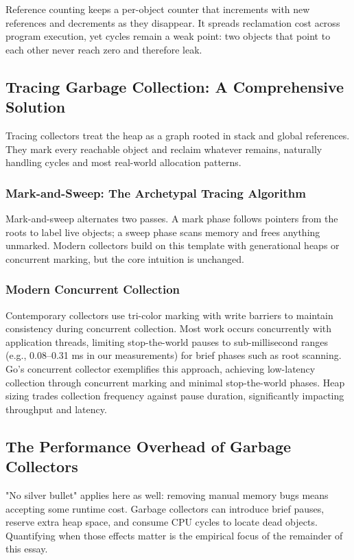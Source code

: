 \documentclass{article}
\begin{document}
Reference counting keeps a per-object counter that increments with new references and decrements as they disappear. It spreads reclamation cost across program execution, yet cycles remain a weak point: two objects that point to each other never reach zero and therefore leak.

\subsection{Tracing Garbage Collection: A Comprehensive Solution}

Tracing collectors treat the heap as a graph rooted in stack and global references. They mark every reachable object and reclaim whatever remains, naturally handling cycles and most real-world allocation patterns.

\subsubsection{Mark-and-Sweep: The Archetypal Tracing Algorithm}

Mark-and-sweep alternates two passes. A mark phase follows pointers from the roots to label live objects; a sweep phase scans memory and frees anything unmarked. Modern collectors build on this template with generational heaps or concurrent marking, but the core intuition is unchanged.

\subsubsection{Modern Concurrent Collection}

Contemporary collectors use tri-color marking with write barriers to maintain consistency during concurrent collection. Most work occurs concurrently with application threads, limiting stop-the-world pauses to sub-millisecond ranges (e.g., 0.08--0.31 ms in our measurements) for brief phases such as root scanning. Go's concurrent collector exemplifies this approach, achieving low-latency collection through concurrent marking and minimal stop-the-world phases. Heap sizing trades collection frequency against pause duration, significantly impacting throughput and latency.

\subsection{The Performance Overhead of Garbage Collectors}
"No silver bullet" applies here as well: removing manual memory bugs means accepting some runtime cost. Garbage collectors can introduce brief pauses, reserve extra heap space, and consume CPU cycles to locate dead objects. Quantifying when those effects matter is the empirical focus of the remainder of this essay.
\end{document}
